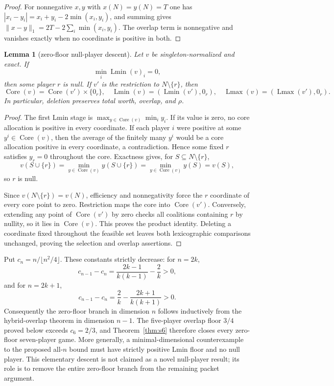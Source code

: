 \documentclass[11pt]{article}
\newtheorem{lemma}[theorem]{Lemma}
\newcommand{\core}{\operatorname{Core}}
\newcommand{\Lmin}{\operatorname{Lmin}}
\newcommand{\Lmax}{\operatorname{Lmax}}
\begin{document}
\begin{proof}
For nonnegative $x,y$ with $x(N)=y(N)=T$ one has
$|x_i-y_i|=x_i+y_i-2\min(x_i,y_i)$, and summing gives
$\|x-y\|_1=2T-2\sum_i\min(x_i,y_i)$.  The overlap term is nonnegative and
vanishes exactly when no coordinate is positive in both.
\end{proof}

\begin{lemma}[zero-floor null-player descent]\label{lem:null-descent}
Let $v$ be singleton-normalized and exact.  If
\[
 \min_i\Lmin(v)_i=0,
\]
then some player $r$ is null.  If $v'$ is the restriction to
$N\setminus\{r\}$, then
\[
 \core(v)=\core(v')\times\{0_r\},
 \quad \Lmin(v)=(\Lmin(v'),0_r),
 \quad \Lmax(v)=(\Lmax(v'),0_r).
\]
In particular, deletion preserves total worth, overlap, and $\rho$.
\end{lemma}

\begin{proof}
The first Lmin stage is
$\max_{y\in\core(v)}\min_i y_i$.  If its value is zero, no core allocation
is positive in every coordinate.  If each player $i$ were positive at some
$y^i\in\core(v)$, then the average of the finitely many $y^i$ would be a core
allocation positive in every coordinate, a contradiction.  Hence some fixed
$r$ satisfies $y_r=0$ throughout the core.  Exactness gives, for
$S\subseteq N\setminus\{r\}$,
\[
 v(S\cup\{r\})=\min_{y\in\core(v)}y(S\cup\{r\})
 =\min_{y\in\core(v)}y(S)=v(S),
\]
so $r$ is null.

Since $v(N\setminus\{r\})=v(N)$, efficiency and nonnegativity force the
$r$ coordinate of every core point to zero.  Restriction maps the core into
$\core(v')$.  Conversely, extending any point of $\core(v')$ by zero checks
all coalitions containing $r$ by nullity, so it lies in $\core(v)$.  This
proves the product identity.  Deleting a coordinate fixed throughout the
feasible set leaves both lexicographic comparisons unchanged, proving the
selection and overlap assertions.
\end{proof}

Put $c_n=n/\lfloor n^2/4\rfloor$.  These constants strictly decrease:
for $n=2k$,
\[
 c_{n-1}-c_n=\frac{2k-1}{k(k-1)}-\frac2k>0,
\]
and for $n=2k+1$,
\[
 c_{n-1}-c_n=\frac2k-\frac{2k+1}{k(k+1)}>0.
\]
Consequently the zero-floor branch in dimension $n$ follows inductively from
the hybrid-overlap theorem in dimension $n-1$.  The five-player overlap floor
$3/4$ proved below exceeds $c_6=2/3$, and Theorem~\ref{thm:s6} therefore
closes every zero-floor seven-player game.  More generally, a
minimal-dimensional counterexample to the proposed all-$n$ bound must have
strictly positive Lmin floor and no null player.  This elementary descent is
not claimed as a novel null-player result; its role is to remove the entire
zero-floor branch from the remaining packet argument.
\end{document}

